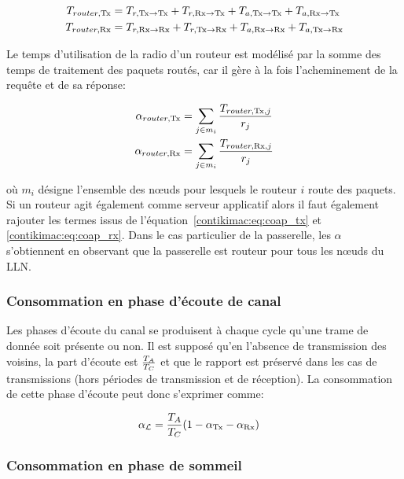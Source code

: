 \begin{align}
  T_{router, \textrm{Tx}} &= T_{r, \textrm{Tx} \to \textrm{Tx}} + T_{r, \textrm{Rx} \to \textrm{Tx}} + T_{a, \textrm{Tx} \to \textrm{Tx}} + T_{a, \textrm{Rx} \to \textrm{Tx}}\\
  T_{router, \textrm{Rx}} &= T_{r, \textrm{Rx} \to \textrm{Rx}} + T_{r, \textrm{Tx} \to \textrm{Rx}} + T_{a, \textrm{Rx} \to \textrm{Rx}} + T_{a, \textrm{Tx} \to \textrm{Rx}}
\end{align}

Le temps d'utilisation de la radio d'un routeur est modélisé par la somme des temps de traitement des paquets routés, car il gère à la fois l'acheminement de la requête et de sa réponse:

\begin{align}
  \alpha_{router, \textrm{Tx}} &= \sum_{j \in m_i} \frac{T_{router, \textrm{Tx}, j}}{r_j}
  \label{contikimac:eq:router_tx}\\
  \alpha_{router, \textrm{Rx}} &= \sum_{j \in m_i} \frac{T_{router, \textrm{Rx}, j}}{r_j}
  \label{contikimac:eq:router_rx}
\end{align}

où $m_i$ désigne l'ensemble des nœuds pour lesquels le routeur $i$ route des paquets.
Si un routeur agit également comme serveur applicatif alors il faut également rajouter les termes issus de l'équation~\ref{contikimac:eq:coap_tx} et \ref{contikimac:eq:coap_rx}.
Dans le cas particulier de la passerelle, les $\alpha$ s'obtiennent en observant que la passerelle est routeur pour tous les nœuds du \ac{LLN}.

\subsubsection{Consommation en phase d'écoute de canal}

Les phases d'écoute du canal se produisent à chaque cycle qu'une trame de donnée soit présente ou non.
Il est supposé qu'en l'absence de transmission des voisins, la part d'écoute est $\frac{T_A}{T_C}$ et que le rapport est préservé dans les cas de transmissions (hors périodes de transmission et de réception).
La consommation de cette phase d'écoute peut donc s'exprimer comme:

\begin{align}
  \alpha_{\mathcal{L}} &= \frac{T_A}{T_C}(1 - \alpha_{\textrm{Tx}} - \alpha_{\textrm{Rx}})
  \label{contikimac:eq:listening}
\end{align}

\subsubsection{Consommation en phase de sommeil}

